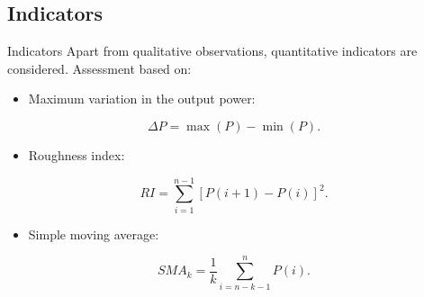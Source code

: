 \subsection{Indicators}
\begin{frame}{Indicators}
  Apart from qualitative observations, quantitative indicators are considered. Assessment based on:
\begin{itemize}
      \item Maximum variation in the output power:
    \end{itemize}
    \begin{equation}
      \Delta P = \max{(P)} - \min{(P)}.
    \end{equation}
  \begin{itemize}
    \item Roughness index:
  \end{itemize}
  \begin{equation}
    RI = \sum_{i=1}^{n-1}\left[ P(i+1) - P(i) \right]^2.
  \end{equation}
  \begin{itemize}
  \item Simple moving average:
  \end{itemize}
  \begin{equation}
    SMA_k = \frac{1}{k} \sum_{i=n-k-1}^n P(i).
  \end{equation}
    
\end{frame}

